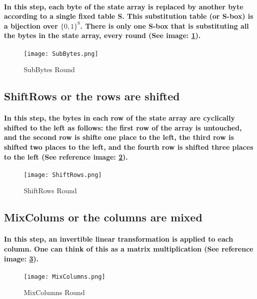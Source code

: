 \paragraph{In this step, each byte of the state array is replaced by another byte according to a single fixed table S. This substitution table (or S-box) is a bijection over $\{0,1\}^8$. There is only one S-box that is substituting all the bytes in the state array, every round (See image: \ref{fig: SubBytes}).}\cite[p. 186]{Katz}

\begin{figure}[H]
\centering
\texttt{[image: SubBytes.png]}
\caption{\label{fig: SubBytes} SubBytes Round}\cite[Webpage]{Crawford}
\end{figure}


\subsection{ShiftRows or the rows are shifted}
\paragraph{In this step, the bytes in each row of the state array are cyclically shifted to the left as follows: the first row of the array is untouched, and the second row is shifte one place to the left, the third row is shifted two places to the left, and the fourth row is shifted three places to the left (See reference image: \ref{fig: ShiftRows}).}\cite[p. 186]{Katz}

\begin{figure}[H]
\centering
\texttt{[image: ShiftRows.png]}
\caption{\label{fig: ShiftRows} ShiftRows Round}\cite[Webpage]{Crawford}
\end{figure}

\subsection{MixColums or the columns are mixed}
\paragraph{In this step, an invertible linear transformation is applied to each column. One can think of this as a matrix multiplication (See reference image: \ref{fig: MixColumns}).}\cite[p. 186]{Katz}

\begin{figure}[H]
\centering
\texttt{[image: MixColumns.png]}
\caption{\label{fig: MixColumns} MixColumns Round}\cite[Webpage]{Crawford}
\end{figure}

